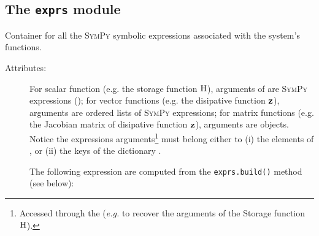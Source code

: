 \documentclass[10pt,a4paper]{article}
\begin{document}
{\subsection{The \texttt{exprs} module} Container for all the \textsc{SymPy} symbolic expressions associated with the system's functions.
\begin{description}
%
\item[Attributes:] For scalar function (e.g. the storage function ${\mathrm{H}}$), arguments of  are \textsc{SymPy} expressions (); for vector functions (e.g. the disipative function ${\mathbf{z}}$), arguments are ordered lists of \textsc{SymPy} expressions; for matrix functions (e.g. the Jacobian matrix of disipative function ${\mathbf{z}}$), arguments are  objects. Notice the expressions arguments\footnote{Accessed through the  (\textit{e.g.}  to recover the arguments of the Storage function ${\mathrm{H}}$).} must belong either to (i) the elements of , or (ii) the keys of the dictionary .
%
%
The following expression are computed from the \texttt{exprs.build()} method (see below):
%
\end{description}}
\end{document}
